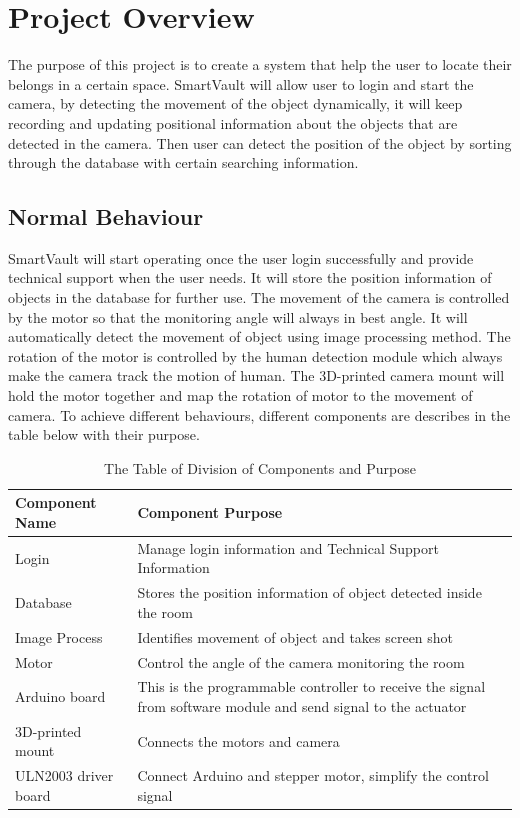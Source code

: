 \documentclass[12pt, titlepage]{article}
\begin{document}
\section{Project Overview}
The purpose of this project is to create a system that help the user to locate their belongs in a certain space. SmartVault will allow user to login and start the camera, by detecting the movement of the object dynamically, it will keep recording and updating positional information about the objects that are detected in the camera. Then user can detect the position of the object by sorting through the database with certain searching information.
\subsection{Normal Behaviour}
SmartVault will start operating once the user login successfully and provide technical support when the user needs. It will store the position information of objects in the database for further use. The movement of the camera is controlled by the motor so that the monitoring angle will always in best angle. It will automatically detect the movement of object using image processing method. The rotation of the motor is controlled by the human detection module which always make the camera track the motion of human. The 3D-printed camera mount will hold the motor together and map the rotation of motor to the movement of camera. To achieve different behaviours, different components are describes in the table below with their purpose. 

\begin{table}[H]
\begin{center}
\caption {The Table of Division of Components and Purpose}
    \begin{tabular}{| p{5cm}| p{9.5cm} |}
    \hline
    \textbf{Component Name} & \textbf{Component Purpose}  \\
    \hline
    Login & Manage login information and Technical Support Information \\
    \hline
    Database  & Stores the position information of object detected inside the room\\
    \hline
    Image Process & Identifies movement of object and takes screen shot\\
    \hline
    Motor & Control the angle of the camera monitoring the room\\
    \hline
    Arduino board & This is the programmable controller to receive the signal from software module and send signal to the actuator \\
    \hline
    3D-printed mount&Connects the motors and camera \\
   	\hline
   	ULN2003 driver board&Connect Arduino and stepper motor, simplify the control signal\\
    \hline
    \end{tabular}
\end{center}
\end{table}
\end{document}
